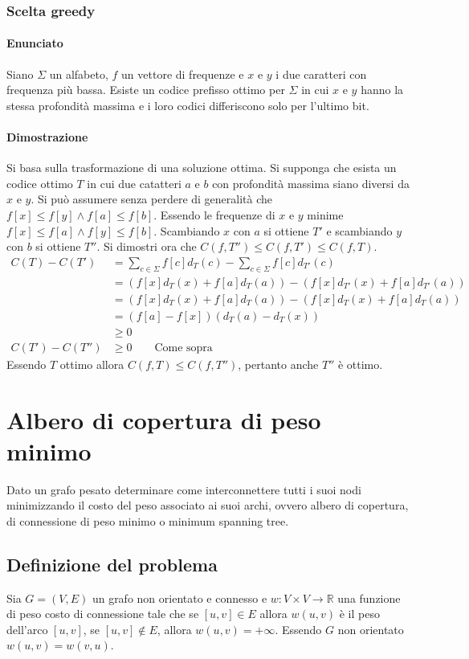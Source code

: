 \subsubsection{Scelta greedy}
\paragraph{Enunciato} 
Siano $\Sigma$ un alfabeto, $f$ un vettore di frequenze e $x$ e $y$ i due caratteri con frequenza pi\`u bassa. Esiste un codice prefisso ottimo per $\Sigma$ in cui $x$ e $y$ hanno la
stessa profondit\`a massima e i loro codici differiscono solo per l'ultimo bit. 
\paragraph{Dimostrazione}
Si basa sulla trasformazione di una soluzione ottima. Si supponga che esista un codice ottimo $T$ in cui due catatteri $a$ e $b$ con profondit\`a massima siano diversi da $x$ e $y$. 
Si pu\`o assumere senza perdere di generalit\`a che $f[x]\le f[y]\land f[a]\le f[b]$. Essendo le frequenze di $x$ e $y$ minime $f[x]\le f[a]\land f[y]\le f[b]$. Scambiando $x$ con $a$
si ottiene $T'$ e scambiando $y$ con $b$ si ottiene $T''$. Si dimostri ora che $C(f, T'')\le C(f, T')\le C(f, T)$.
\begin{align*}
	C(T) - C(T') & = \sum\limits_{c\in \Sigma}f[c]d_T(c) - \sum\limits_{c\in\Sigma}f[c]d_{T'}(c)\\
	             & = (f[x]d_T(x)+f[a]d_T(a)) - (f[x]d_{T'}(x) + f[a]d_{T'}(a))\\
		     & = (f[x]d_T(x)+f[a]d_T(a)) - (f[x]d_{T}(x) + f[a]d_{T}(a))\\
		     & = (f[a] - f[x])(d_T(a) - d_T(x))\\
		     & \ge 0\\
	C(T') - C(T'') & \ge 0\quad\quad \text{Come sopra}
\end{align*}
Essendo $T$ ottimo allora $C(f, T)\le C(f, T'')$, pertanto anche $T''$ \`e ottimo.
\section{Albero di copertura di peso minimo}
Dato un grafo pesato determinare come interconnettere tutti i suoi nodi minimizzando il costo del peso associato ai suoi archi, ovvero albero di copertura, di connessione di peso minimo
o minimum spanning tree.
\subsection{Definizione del problema}
Sia $G=(V, E)$ un grafo non orientato e connesso e $w:V\times V\rightarrow\mathbb{R}$ una funzione di peso costo di connessione tale che se $[u, v]\in E$ allora $w(u, v)$ \`e il peso 
dell'arco $[u, v]$, se $[u, v]\not\in E$, allora $w(u, v)= + \infty$. Essendo $G$ non orientato $w(u, v) = w(v, u)$.

